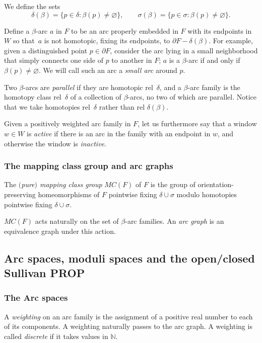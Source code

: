 \documentclass[pdftex]{sigma}
\begin{document}
We def\/ine the sets
\[
\delta
(\beta )=\{ p\in\delta :\beta (p)\neq\varnothing\},\qquad \sigma
(\beta )=\{ p\in\sigma :\beta (p)\neq\varnothing\} .
\]


Def\/ine a $\beta$-arc $a$ in $F$ to be an arc properly embedded in $F$ with its endpoints in $W$ so that~$a$ is not
homotopic, f\/ixing its endpoints, to $\partial F-\delta (\beta )$.  For example, given a distinguished point
$p\in\partial
F$, consider the arc lying in a small neighborhood that simply connects one side of $p$ to another in $F$; $a$ is
a $\beta$-arc if and only if
$\beta (p)\neq\varnothing$. We will call such an arc a {\it small arc} around $p$.

Two $\beta$-arcs are {\it parallel} if they are homotopic rel~$\delta$, and a $\beta$-arc family is the homotopy
class
rel~$\delta$ of a collection of $\beta$-arcs, no two of which are parallel.  Notice that we take homotopies rel~$\delta$
rather than
rel $\delta (\beta )$.





Given a positively weighted arc family in $F$, let us furthermore say that a window $w\in W$ is {\it active}
if there
is an arc in the family with an endpoint in $w$, and otherwise the window is {\it inactive}.



\subsubsection{The mapping class group and arc graphs}

The {\it $($pure$)$ mapping class group} $MC(F)$ of $F$ is the group of
orientation-preserving homeomorphisms of $F$ pointwise f\/ixing
$\delta\cup\sigma$ modulo homotopies pointwise f\/ixing $\delta\cup\sigma$.


$MC(F)$ acts naturally on the set of $\beta$-arc families.
An {\it arc graph} is an equivalence graph under this action.

\subsection{Arc spaces, moduli spaces and the open/closed Sullivan PROP}
\subsubsection{The Arc spaces}



A {\it  weighting} on an arc family is the assignment of
a positive  real number to each of its components.
A weighting naturally passes to the arc graph.
A weighting is called {\it discrete} if it takes values in ${\mathbb N}$.
\end{document}
